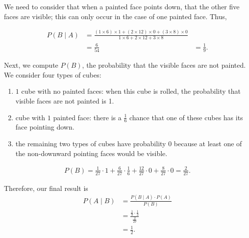 \documentclass{article}
\theoremstyle{mytheoremstyle}
\theoremstyle{mytheoremstyle}
\theoremstyle{myproblemstyle}
\begin{document}
    We need to consider that when a painted face points down, that the other
    five faces are visible; this can only occur in the case of one painted
    face. Thus,

    \begin{align*}
      P(B \mid A) &= \frac{(1\times 6) \times 1 + (2 \times 12) \times 0 + (3
      \times 8) \times  0}{1\times 6 + 2\times 12 + 3\times 8} \\
        &= \frac{6}{54}
        &= \frac{1}{9}.
    \end{align*}

    Next, we compute \( P (B) \), the probability that the visible faces are
    not painted. We consider four types of cubes:

    \begin{enumerate}
      \item \( 1 \) cube with no painted faces: when this cube is rolled, the
        probability that visible faces are not painted is 1.
      \item cube with \( 1 \) painted face: there is a \( \frac{1}{6} \) chance
        that one of these cubes has its face pointing down.
      \item the remaining two types of cubes have probability \( 0 \) because
        at least one of the non-downward pointing faces would be visible.
    \end{enumerate}

    \begin{align*}
      P(B) = \frac{1}{27} \cdot 1 + \frac{6}{27} \cdot \frac{1}{6} +
      \frac{12}{27}\cdot 0 + \frac{8}{27} \cdot 0 = \frac{2}{27}.
    \end{align*}

    Therefore, our final result is
    \begin{align*}
      P(A \mid B) &= \frac{P(B \mid A) \cdot P(A)}{P(B)} \\
                  &= \frac{\frac{1}{9} \cdot \frac{1}{3}}{\frac{2}{27}}  \\
                  &= \frac{1}{2}.
    \end{align*}
\end{document}
